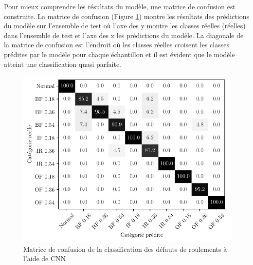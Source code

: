 Pour mieux comprendre les résultats du modèle, une matrice de confusion est construite. La matrice de confusion (Figure \ref{fig:bearings_faults_classification_confusion_matrix}) montre les résultats des prédictions du modèle sur l'ensemble de test où l'axe des y montre les classes réelles (réelles) dans l'ensemble de test et l'axe des x les prédictions du modèle. La diagonale de la matrice de confusion est l'endroit où les classes réelles croisent les classes prédites par le modèle pour chaque échantillon et il est évident que le modèle atteint une classification quasi parfaite.

\begin{figure}[H]
    \centering
    \includegraphics{figures/cw_bearings_faults_classification_fr_retrained.pdf}
    \caption{Matrice de confusion de la classification des défauts de roulements à l'aide de CNN}
    \label{fig:bearings_faults_classification_confusion_matrix}
\end{figure}

